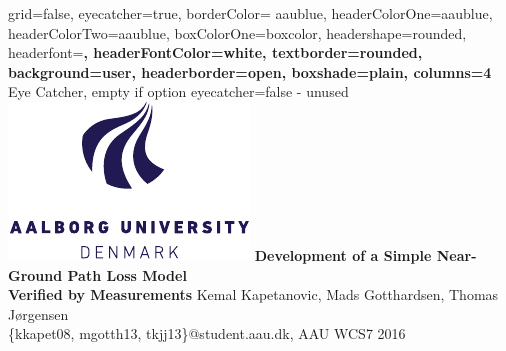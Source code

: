 \documentclass[a0paper,landscape]{baposter}
\begin{document}

\background{
}

\begin{poster}{
	grid=false,
	eyecatcher=true, 
	borderColor= aaublue,
	headerColorOne=aaublue,
	headerColorTwo=aaublue,
	boxColorOne=boxcolor,
	headershape=rounded,
	headerfont=\Large\sf\bf,
	headerFontColor=white,
	textborder=rounded,
	background=user,
	headerborder=open,
  	boxshade=plain,
  	columns=4
}
{
	Eye Catcher, empty if option eyecatcher=false - unused
	\hspace{1cm} \includegraphics[scale=0.9]{aau_logo_new}
}
{\sf\bf
	Development of a Simple Near-Ground Path Loss Model \\Verified by Measurements
}
{
	 Kemal Kapetanovic, Mads Gotthardsen, Thomas Jørgensen \\
	\smaller \{kkapet08, mgotth13, tkjj13\}@student.aau.dk, AAU WCS7 2016
}
{
\setlength\fboxsep{0pt}
\setlength\fboxrule{0pt}
}
\end{poster}
\end{document}
